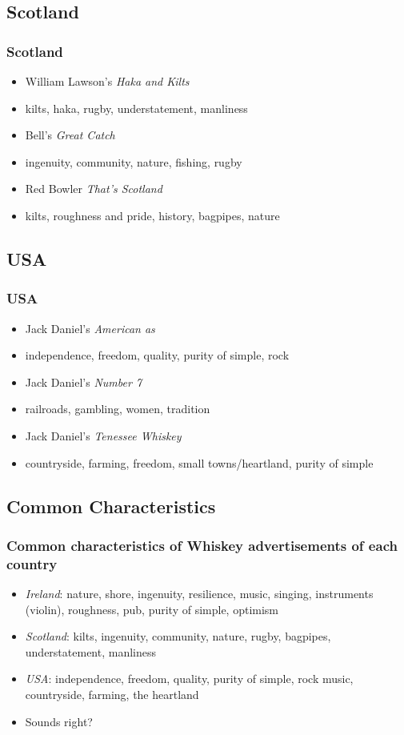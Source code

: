\documentclass{beamer}
\begin{document}
\subsection{Scotland}

\begin{frame}
 \frametitle{Scotland}
 \begin{itemize}
  \item<1-> William Lawson's \emph{Haka and Kilts}
  \item<2-> kilts, haka, rugby, understatement, manliness
  \item<3-> Bell's \emph{Great Catch}
  \item<4-> ingenuity, community, nature, fishing, rugby
  \item<5-> Red Bowler \emph{That's Scotland}
  \item<6> kilts, roughness and pride, history, bagpipes, nature
 \end{itemize}
\end{frame}

\subsection{USA}

\begin{frame}
 \frametitle{USA}
 \begin{itemize}
  \item<1-> Jack Daniel's \emph{American as}
  \item<2-> independence, freedom, quality, purity of simple, rock
  \item<3-> Jack Daniel's \emph{Number 7}
  \item<4-> railroads, gambling, women, tradition
  \item<5-> Jack Daniel's \emph{Tenessee Whiskey}
  \item<6-> countryside, farming, freedom, small towns/heartland, purity of simple
 \end{itemize}
\end{frame}

\subsection{Common Characteristics}

\begin{frame}
 \frametitle{Common characteristics of Whiskey advertisements of each country}
 \begin{itemize}
  \item<2->\emph{Ireland}: nature, shore, ingenuity, resilience, music, singing, instruments (violin), roughness, pub, purity of simple, optimism
  \item<3->\emph{Scotland}: kilts, ingenuity, community, nature, rugby, bagpipes, understatement, manliness
  \item<4->\emph{USA}: independence, freedom, quality, purity of simple, rock music, countryside, farming, the heartland
  \item<5->Sounds right?
 \end{itemize}
\end{frame}
\end{document}

